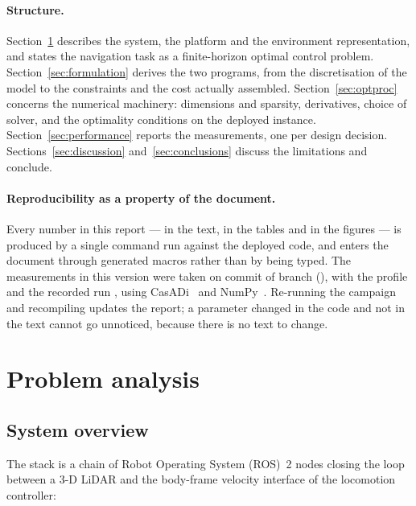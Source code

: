 \documentclass[11pt,a4paper]{article}
\begin{document}
\paragraph{Structure.}
Section~\ref{sec:problem} describes the system, the platform and the environment representation, and states
the navigation task as a finite-horizon optimal control problem. Section~\ref{sec:formulation} derives the
two programs, from the discretisation of the model to the constraints and the cost actually assembled.
Section~\ref{sec:optproc} concerns the numerical machinery: dimensions and sparsity, derivatives, choice of
solver, and the optimality conditions on the deployed instance. Section~\ref{sec:performance} reports the
measurements, one per design decision. Sections~\ref{sec:discussion} and~\ref{sec:conclusions} discuss the
limitations and conclude.

\paragraph{Reproducibility as a property of the document.}
\begin{sloppypar}
Every number in this report --- in the text, in the tables and in the figures --- is produced by a single
command run against the deployed code, and enters the document through generated macros rather than by being
typed. The measurements in this version were taken on commit \texttt{\resCommit} of branch
\texttt{\resBranch} (\resDate), with the profile \resProfile{} and the recorded run \resBag, using
CasADi~\resCasadi{} and NumPy~\resNumpy. Re-running the campaign and recompiling updates the report;
a parameter changed in the code and not in the text cannot go unnoticed, because there is no text to change.
\end{sloppypar}

\section{Problem analysis}
\label{sec:problem}

\subsection{System overview}
\label{sec:overview}

The stack is a chain of Robot Operating System (ROS)~2 nodes closing the loop between a 3-D LiDAR and the body-frame velocity
interface of the locomotion controller:
\end{document}
